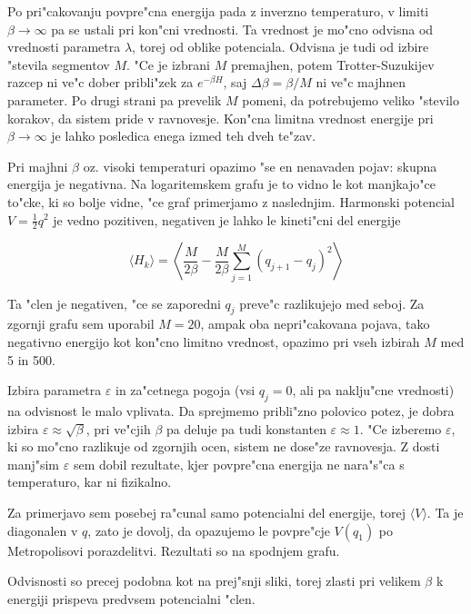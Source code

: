 \documentclass[a4paper,10pt]{article}
\begin{document}
\begin{figure}[H]
 \centering
 
\end{figure}

Po pri"cakovanju povpre"cna energija pada z inverzno temperaturo, v limiti $\beta \to \infty$ pa se ustali pri kon"cni vrednosti. 
Ta vrednost je mo"cno odvisna od vrednosti parametra $\lambda$, torej od oblike potenciala. Odvisna je tudi od izbire "stevila segmentov $M$. 
"Ce je izbrani $M$ premajhen, potem Trotter-Suzukijev razcep ni ve"c dober pribli"zek za $e^{-\beta H}$, saj $\Delta\beta = \beta/M$ ni ve"c majhnen parameter. 
Po drugi strani pa prevelik $M$ pomeni, da potrebujemo veliko "stevilo korakov, da sistem pride v ravnovesje. 
Kon"cna limitna vrednost energije pri $\beta \to \infty$ je lahko posledica enega izmed teh dveh te"zav. 

Pri majhni $\beta$ oz. visoki temperaturi opazimo "se en nenavaden pojav: skupna energija je negativna. 
Na logaritemskem grafu je to vidno le kot manjkajo"ce to"cke, ki so bolje vidne, "ce graf primerjamo z naslednjim. 
Harmonski potencial $V=\frac{1}{2}q^2$ je vedno pozitiven, negativen je lahko le kineti"cni del energije

$$\langle H_k \rangle = \left\langle \frac{M}{2\beta} - \frac{M}{2\beta} \sum_{j=1}^{M}(q_{j+1} - q_j)^2 \right\rangle$$

Ta "clen je negativen, "ce se zaporedni $q_j$ preve"c razlikujejo med seboj. 
Za zgornji grafu sem uporabil $M=20$, ampak oba nepri"cakovana pojava, tako negativno energijo kot kon"cno limitno vrednost, opazimo pri vseh izbirah $M$ med 5 in 500. 

Izbira parametra $\varepsilon$ in za"cetnega pogoja (vsi $q_j = 0$, ali pa naklju"cne vrednosti) na odvisnost le malo vplivata. 
Da sprejmemo pribli"zno polovico potez, je dobra izbira $\varepsilon \approx \sqrt{\beta}$, pri ve"cjih $\beta$ pa deluje pa tudi konstanten $\varepsilon \approx 1$. 
"Ce izberemo $\varepsilon$, ki so mo"cno razlikuje od zgornjih ocen, sistem ne dose"ze ravnovesja. 
Z dosti manj"sim $\varepsilon$ sem dobil rezultate, kjer povpre"cna energija ne nara"s"ca s temperaturo, kar ni fizikalno. 

Za primerjavo sem posebej ra"cunal samo potencialni del energije, torej $\langle V \rangle$. 
Ta je diagonalen v $q$, zato je dovolj, da opazujemo le povpre"cje $V(q_1)$ po Metropolisovi porazdelitvi. 
Rezultati so na spodnjem grafu. 

\begin{figure}[H]
 \centering
 
\end{figure}

Odvisnosti so precej podobna kot na prej"snji sliki, torej zlasti pri velikem $\beta$ k energiji prispeva predvsem potencialni "clen. 
\end{document}
